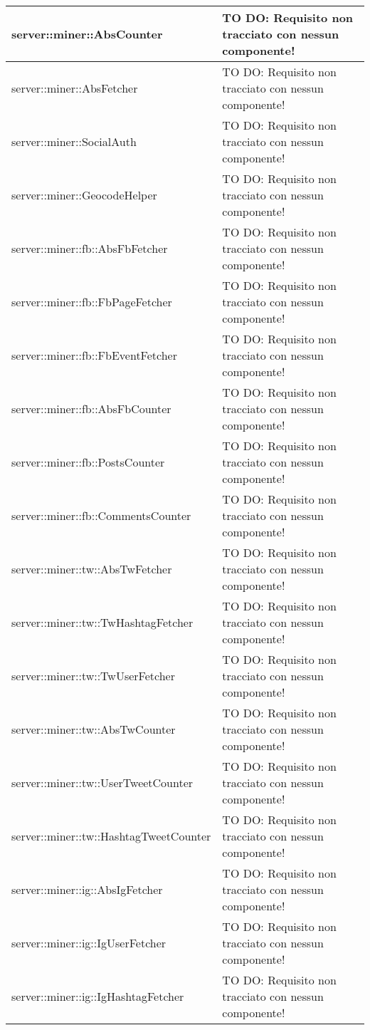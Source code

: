 \begin{center}
\begin{longtable}{| p{11cm} | p{2.5cm} |}
\hline
server::miner::AbsCounter & TO DO: Requisito non tracciato con nessun componente! \\
\hline
server::miner::AbsFetcher & TO DO: Requisito non tracciato con nessun componente! \\
\hline
server::miner::SocialAuth & TO DO: Requisito non tracciato con nessun componente! \\
\hline
server::miner::GeocodeHelper & TO DO: Requisito non tracciato con nessun componente! \\
\hline
server::miner::fb::AbsFbFetcher & TO DO: Requisito non tracciato con nessun componente! \\
\hline
server::miner::fb::FbPageFetcher & TO DO: Requisito non tracciato con nessun componente! \\
\hline
server::miner::fb::FbEventFetcher & TO DO: Requisito non tracciato con nessun componente! \\
\hline
server::miner::fb::AbsFbCounter & TO DO: Requisito non tracciato con nessun componente! \\
\hline
server::miner::fb::PostsCounter & TO DO: Requisito non tracciato con nessun componente! \\
\hline
server::miner::fb::CommentsCounter & TO DO: Requisito non tracciato con nessun componente! \\
\hline
server::miner::tw::AbsTwFetcher & TO DO: Requisito non tracciato con nessun componente! \\
\hline
server::miner::tw::TwHashtagFetcher & TO DO: Requisito non tracciato con nessun componente! \\
\hline
server::miner::tw::TwUserFetcher & TO DO: Requisito non tracciato con nessun componente! \\
\hline
server::miner::tw::AbsTwCounter & TO DO: Requisito non tracciato con nessun componente! \\
\hline
server::miner::tw::UserTweetCounter & TO DO: Requisito non tracciato con nessun componente! \\
\hline
server::miner::tw::HashtagTweetCounter & TO DO: Requisito non tracciato con nessun componente! \\
\hline
server::miner::ig::AbsIgFetcher & TO DO: Requisito non tracciato con nessun componente! \\
\hline
server::miner::ig::IgUserFetcher & TO DO: Requisito non tracciato con nessun componente! \\
\hline
server::miner::ig::IgHashtagFetcher & TO DO: Requisito non tracciato con nessun componente! \\

\end{longtable}
\end{center}
